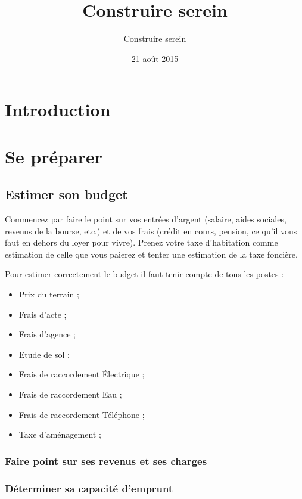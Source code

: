 \documentclass[french]{book}
\title{Construire serein}
\author{Construire serein}
\date{21 août 2015}
\begin{document}
\maketitle
\newpage
\tableofcontents

\chapter{Introduction}

\chapter{Se préparer}
\section{Estimer son budget}
Commencez par faire le point sur vos entrées d'argent (salaire, aides sociales, revenus de la bourse, etc.) et de vos frais (crédit en cours, pension, ce qu'il vous faut en dehors du loyer pour vivre). Prenez votre taxe d'habitation comme estimation de celle que vous paierez et tenter une estimation de la taxe foncière.

Pour estimer correctement le budget il faut tenir compte de tous les postes :
\begin{itemize}
    \item Prix du terrain ;
    \item Frais d'acte ;
    \item Frais d'agence ;
    \item Etude de sol ;
    \item Frais de raccordement Électrique ;
    \item Frais de raccordement Eau ;
    \item Frais de raccordement Téléphone ;
    \item Taxe d'aménagement ;
\end{itemize}

\subsection{Faire point sur ses revenus et ses charges}
\subsection{Déterminer sa capacité d’emprunt}
\end{document}
